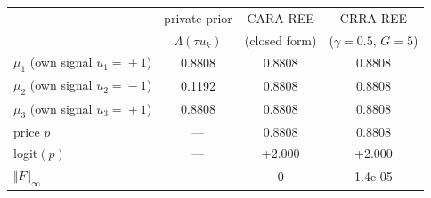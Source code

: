 \documentclass[border=2pt]{standalone}
\begin{document}
\pagecolor{placeholderbg}
\begin{tabular}{lccc}
\toprule
  & private prior  &  CARA REE  &  CRRA REE \\
  &  $\Lambda(\tau u_k)$  &  (closed form)  &  ($\gamma\!=\!0.5$, $G\!=\!5$) \\
\midrule
  $\mu_1$ (own signal $u_1\!=\!+1$)  &  0.8808  &  0.8808  &  0.8808 \\
  $\mu_2$ (own signal $u_2\!=\!-1$)  &  0.1192  &  0.8808  &  0.8808 \\
  $\mu_3$ (own signal $u_3\!=\!+1$)  &  0.8808  &  0.8808  &  0.8808 \\
  price $p$  &  ---  &  0.8808  &  0.8808 \\
  logit$(p)$  &  ---  &  +2.000  &  +2.000 \\
  $\Vert F\Vert_\infty$  &  ---  &  $0$  &  1.4e-05 \\
\bottomrule
\end{tabular}
\end{document}
